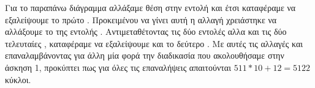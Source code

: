 \documentclass{assignment}
\begin{document}

Για το παραπάνω διάγραμμα αλλάξαμε θέση στην εντολή  και έτσι καταφέραμε να εξαλείψουμε το πρώτο . Προκειμένου να γίνει αυτή η αλλαγή χρειάστηκε να αλλάξουμε το  της εντολής .
Αντιμεταθέτοντας τις δύο εντολές  αλλα και τις δύο τελευταίες , καταφέραμε να εξαλείψουμε και το δεύτερο . Με αυτές τις αλλαγές και επαναλαμβάνοντας για άλλη μία φορά την διαδικασία που ακολουθήσαμε στην άσκηση 1, προκύπτει πως για όλες τις επαναλήψεις απαιτούνται $511*10 + 12 = 5122$ κύκλοι.
\end{document}
